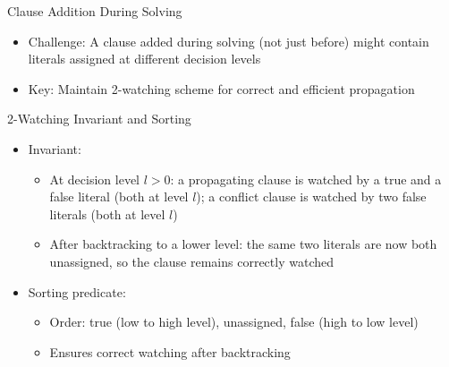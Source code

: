 \documentclass{beamer}
\begin{document}
\begin{frame}{Clause Addition During Solving}
  \begin{itemize}
    \item Challenge: A clause added during solving (not just before) might contain literals assigned at different decision levels
    \item Key: Maintain 2-watching scheme for correct and efficient propagation
  \end{itemize}
\end{frame}

\begin{frame}{2-Watching Invariant and Sorting}
  \begin{itemize}
    \item Invariant:
      \begin{itemize}
        \item At decision level $l > 0$: a propagating clause is watched by a true and a false literal (both at level $l$); a conflict clause is watched by two false literals (both at level $l$)
        \item After backtracking to a lower level: the same two literals are now both unassigned, so the clause remains correctly watched
      \end{itemize}
    \item Sorting predicate:
      \begin{itemize}
        \item Order: true (low to high level), unassigned, false (high to low level)
        \item Ensures correct watching after backtracking
      \end{itemize}
  \end{itemize}
\end{frame}
\end{document}
